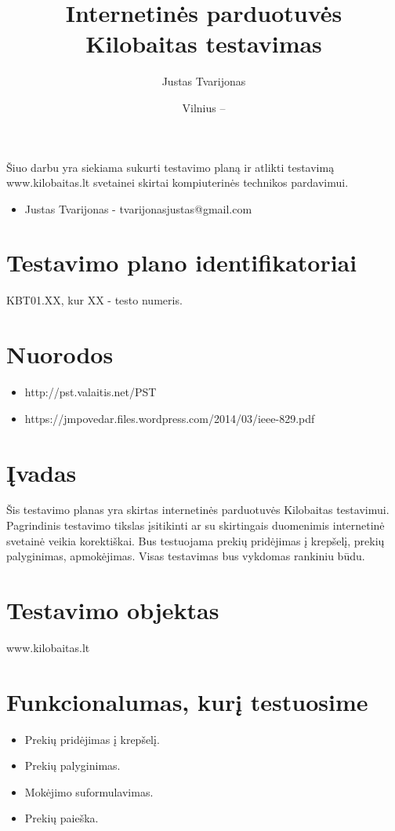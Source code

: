 \documentclass{VUMIFPSkursinis}
\title{Internetinės parduotuvės Kilobaitas testavimas}
\author{Justas Tvarijonas}
\date{Vilnius – \the\year}
\begin{document}
\maketitle
{}
Šiuo darbu yra siekiama sukurti testavimo planą ir atlikti testavimą www.kilobaitas.lt svetainei skirtai kompiuterinės technikos pardavimui.
\begin{itemize}
	\item Justas Tvarijonas - tvarijonasjustas@gmail.com
\end{itemize}
\tableofcontents
{}
\section{Testavimo plano identifikatoriai}
KBT01.XX, kur XX - testo numeris.
\vspace{1cm}
\section{Nuorodos}
\begin{itemize}
	\item http://pst.valaitis.net/PST
	\item https://jmpovedar.files.wordpress.com/2014/03/ieee-829.pdf
\end{itemize}
\vspace{1cm}
\section{Įvadas}
Šis testavimo planas yra skirtas internetinės parduotuvės Kilobaitas testavimui. Pagrindinis testavimo tikslas įsitikinti ar su skirtingais duomenimis internetinė svetainė veikia korektiškai. Bus testuojama prekių pridėjimas į krepšelį, prekių palyginimas, apmokėjimas. Visas testavimas bus vykdomas rankiniu būdu.
\vspace{1cm}
\section{Testavimo objektas}
www.kilobaitas.lt
\vspace{1cm}
\section{Funkcionalumas, kurį testuosime}
\begin{itemize}
	\item Prekių pridėjimas į krepšelį.
	\item Prekių palyginimas.
	\item Mokėjimo suformulavimas. 
	\item Prekių paieška.
\end{itemize}
\vspace{1cm}
\end{document}
